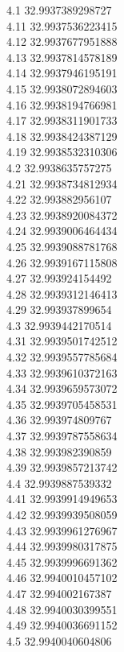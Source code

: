{4.1	32.9937389298727\\
4.11	32.9937536223415\\
4.12	32.9937677951888\\
4.13	32.9937814578189\\
4.14	32.9937946195191\\
4.15	32.9938072894603\\
4.16	32.9938194766981\\
4.17	32.9938311901733\\
4.18	32.9938424387129\\
4.19	32.9938532310306\\
4.2	32.9938635757275\\
4.21	32.9938734812934\\
4.22	32.993882956107\\
4.23	32.9938920084372\\
4.24	32.9939006464434\\
4.25	32.9939088781768\\
4.26	32.9939167115808\\
4.27	32.993924154492\\
4.28	32.9939312146413\\
4.29	32.993937899654\\
4.3	32.9939442170514\\
4.31	32.9939501742512\\
4.32	32.9939557785684\\
4.33	32.9939610372163\\
4.34	32.9939659573072\\
4.35	32.9939705458531\\
4.36	32.993974809767\\
4.37	32.9939787558634\\
4.38	32.993982390859\\
4.39	32.9939857213742\\
4.4	32.9939887539332\\
4.41	32.9939914949653\\
4.42	32.9939939508059\\
4.43	32.9939961276967\\
4.44	32.9939980317875\\
4.45	32.9939996691362\\
4.46	32.9940010457102\\
4.47	32.994002167387\\
4.48	32.9940030399551\\
4.49	32.9940036691152\\
4.5	32.9940040604806\\
}
